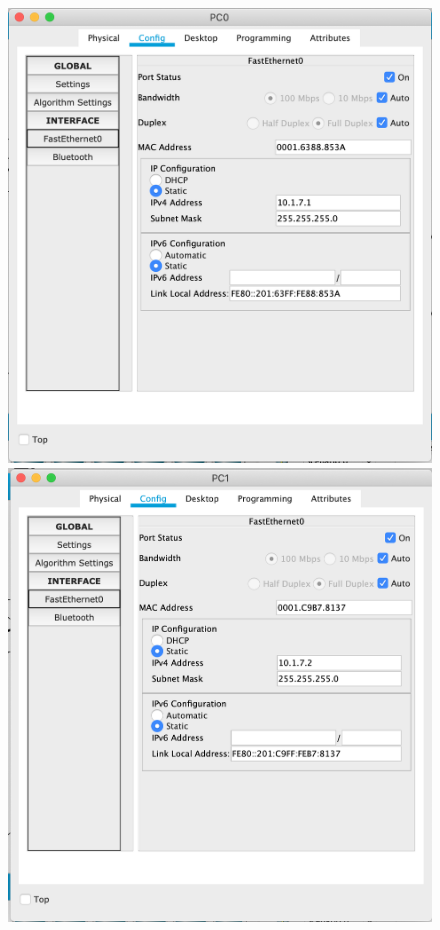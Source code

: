 \documentclass[a4paper,12pt]{article}
\begin{document}
	\begin{figure}[h!]
		\begin{minipage}[b]{0.32\textwidth}
			\includegraphics[width=\textwidth]{1.1.png}
		\end{minipage}
		\begin{minipage}[b]{0.32\textwidth}
			\includegraphics[width=\textwidth]{1.2.png}

\end{minipage}
\end{figure}
\end{document}
